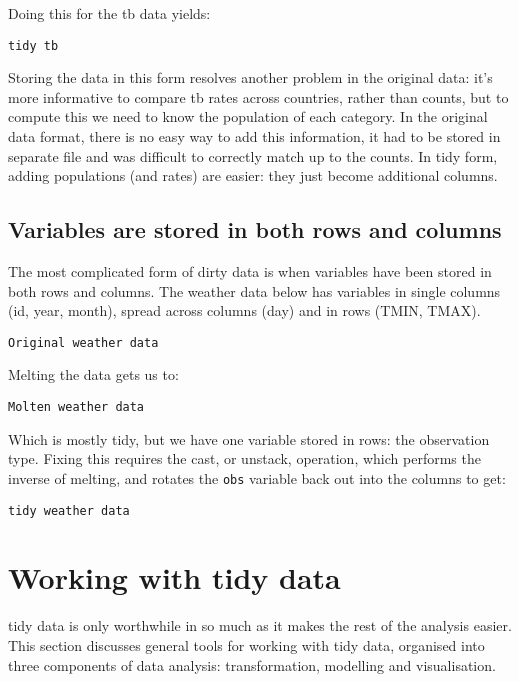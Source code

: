 \documentclass[oneside]{article}
\begin{document}
Doing this for the tb data yields:

\begin{verbatim}
tidy tb
\end{verbatim}

Storing the data in this form resolves another problem in the original data: it's more informative to compare tb rates across countries, rather than counts, but to compute this we need to know the population of each category. In the original data format, there is no easy way to add this information, it had to be stored in separate file and was difficult to correctly match up to the counts. In tidy form, adding populations (and rates) are easier: they just become additional columns.

\subsection{Variables are stored in both rows and columns}

The most complicated form of dirty data is when variables have been stored in both rows and columns. The weather data below has variables in single columns (id, year, month), spread across columns (day) and in rows (TMIN, TMAX).  

\begin{verbatim}
Original weather data
\end{verbatim}

Melting the data gets us to:

\begin{verbatim}
Molten weather data
\end{verbatim}

Which is mostly tidy, but we have one variable stored in rows: the observation type. Fixing this requires the cast, or unstack, operation, which performs the inverse of melting, and rotates the \texttt{obs} variable back out into the columns to get:

\begin{verbatim}
tidy weather data
\end{verbatim}

\section{Working with tidy data}

tidy data is only worthwhile in so much as it makes the rest of the analysis easier. This section discusses general tools for working with tidy data, organised into three components of data analysis: transformation, modelling and visualisation.
\end{document}
